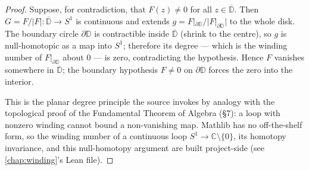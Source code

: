\begin{proof}
  \leanok
  Suppose, for contradiction, that $F(z) \ne 0$ for all $z \in
  \overline{\mathbb{D}}$. Then $G = F/\lvert F\rvert : \overline{\mathbb{D}} \to
  S^1$ is continuous and extends $g = F|_{\partial\mathbb{D}}/\lvert
  F|_{\partial\mathbb{D}}\rvert$ to the whole disk. The boundary circle
  $\partial\mathbb{D}$ is contractible inside $\overline{\mathbb{D}}$ (shrink to
  the centre), so $g$ is null-homotopic as a map into $S^1$; therefore its degree
  --- which is the winding number of $F|_{\partial\mathbb{D}}$ about $0$ --- is
  zero, contradicting the hypothesis. Hence $F$ vanishes somewhere in
  $\overline{\mathbb{D}}$; the boundary hypothesis $F \ne 0$ on
  $\partial\mathbb{D}$ forces the zero into the interior.

  This is the planar degree principle the source invokes by analogy with the
  topological proof of the Fundamental Theorem of Algebra (\S7): a loop with
  nonzero winding cannot bound a non-vanishing map. Mathlib has no off-the-shelf
  form, so the winding number of a continuous loop $S^1 \to \mathbb{C}\setminus
  \{0\}$, its homotopy invariance, and this null-homotopy argument are built
  project-side (see \cref{chap:winding}'s Lean file).
\end{proof}
